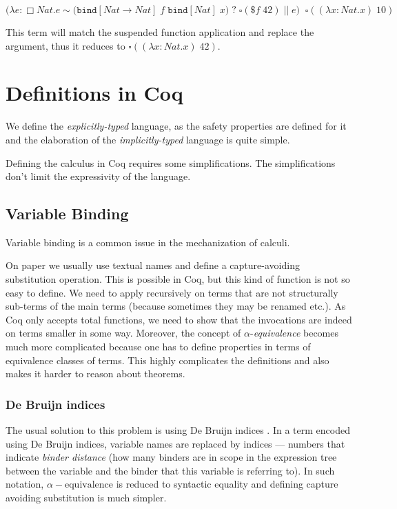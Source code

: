 \documentclass[runningheads]{article}
\newcommand{\qtype}[1]{\Box#1}
\newcommand{\patapp}[2]{#1\;#2}
\newcommand{\patbind}[2]{\texttt{bind}[#2]\;#1}
\newcommand{\lam}[3]{\lambda#1{:}#2.#3}
\begin{document}
\begin{equation*}
  \Big(\lam{e}{\qtype{Nat}}{e \sim \big( \patapp{\patbind{f}{Nat \to Nat}}{\patbind{x}{Nat}} \big) \; ? \; \square(\$f \; 42) \; || \; e} \Big) \;\; \square((\lam{x}{Nat}{x}) \; 10)
\end{equation*}

This term will match the suspended function application and replace the argument, thus it reduces to $\square((\lam{x}{Nat}{x}) \; 42)$.

\section{Definitions in Coq}
\label{sec:definitions}
We define the \textit{explicitly-typed} language, as the safety properties are defined for it and the elaboration of the \textit{implicitly-typed} language is quite simple.

Defining the calculus in Coq requires some simplifications. The simplifications don't limit the expressivity of the language.

\subsection{Variable Binding}

Variable binding is a common issue in the mechanization of calculi.

On paper we usually use textual names and define a capture-avoiding substitution operation. This is possible in Coq, but this kind of function is not so easy to define. We need to apply recursively on terms that are not structurally sub-terms of the main terms (because sometimes they may be renamed etc.). As Coq only accepts total functions, we need to show that the invocations are indeed on terms smaller in some way. Moreover, the concept of $\alpha$-\textit{equivalence} becomes much more complicated because one has to define properties in terms of equivalence classes of terms. This highly complicates the definitions and also makes it harder to reason about theorems.

\subsubsection{De Bruijn indices}

The usual solution to this problem is using De Bruijn indices \cite{Bruijn1972LambdaCN}. In a term encoded using De Bruijn indices, variable names are replaced by indices --- numbers that indicate \textit{binder distance} (how many binders are in scope in the expression tree between the variable and the binder that this variable is referring to). In such notation, $\alpha-\text{equivalence}$ is reduced to syntactic equality and defining capture avoiding substitution is much simpler.
\end{document}

